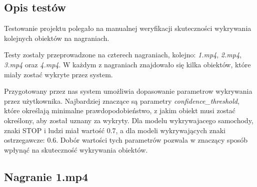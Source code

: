 \subsection{Opis testów}
Testowanie projektu polegało na manualnej weryfikacji skuteczności wykrywania kolejnych obiektów na
nagraniach.

Testy zostały przeprowadzone na czterech nagraniach, kolejno: \textit{1.mp4}, \textit{2.mp4}, \textit{3.mp4}
oraz \textit{4.mp4}.
W każdym z nagraniach znajdowało się kilka obiektów, które miały zostać wykryte przez system.

Przygotowany przez nas system umożliwia dopasowanie parametrow wykrywania przez użytkownika. Najbardziej
znaczące są parametry \textit{confidence\_threshold}, które określają minimalne prawdopodobieństwo, z jakim
obiekt musi zostać określony, aby został uznany za wykryty. Dla modelu wykrywajacego samochody, znaki STOP i
ludzi miał wartość 0.7, a dla modeli wykrywających znaki ostrzegawcze: 0.6. Dobór wartości tych parametrów
pozwala w znaczący sposób wpłynąć na skuteczność wykrywania obiektów.

\subsection{Nagranie 1.mp4}

